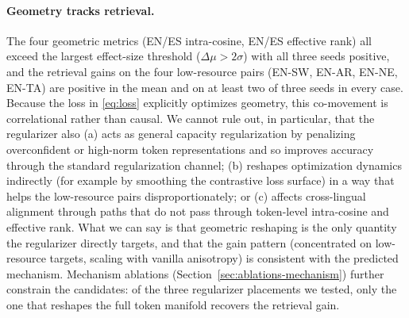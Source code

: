 \paragraph{Geometry tracks retrieval.} The four geometric metrics (EN/ES intra-cosine, EN/ES effective rank) all exceed the largest effect-size threshold ($\Delta\mu > 2\sigma$) with all three seeds positive, and the retrieval gains on the four low-resource pairs (EN-SW, EN-AR, EN-NE, EN-TA) are positive in the mean and on at least two of three seeds in every case. Because the loss in \eqref{eq:loss} explicitly optimizes geometry, this co-movement is correlational rather than causal. We cannot rule out, in particular, that the regularizer also (a) acts as general capacity regularization by penalizing overconfident or high-norm token representations and so improves accuracy through the standard regularization channel; (b) reshapes optimization dynamics indirectly (for example by smoothing the contrastive loss surface) in a way that helps the low-resource pairs disproportionately; or (c) affects cross-lingual alignment through paths that do not pass through token-level intra-cosine and effective rank. What we can say is that geometric reshaping is the only quantity the regularizer directly targets, and that the gain pattern (concentrated on low-resource targets, scaling with vanilla anisotropy) is consistent with the predicted mechanism. Mechanism ablations (Section~\ref{sec:ablations-mechanism}) further constrain the candidates: of the three regularizer placements we tested, only the one that reshapes the full token manifold recovers the retrieval gain.

